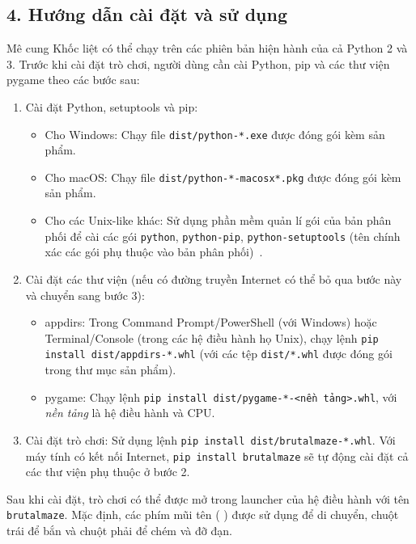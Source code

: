 \documentclass[a4paper,11pt]{article}
\begin{document}
\subsection*{4. Hướng dẫn cài đặt và sử dụng}
Mê cung Khốc liệt có thể chạy trên các phiên bản hiện hành của cả Python 2 và
3. Trước khi cài đặt trò chơi, người dùng cần cài Python, pip và các thư viện
pygame theo các bước sau:
\begin{enumerate}
  \item Cài đặt Python, setuptools và pip:
    \begin{itemize}
      \item Cho Windows: Chạy file \verb|dist/python-*.exe| được đóng gói kèm
        sản phẩm.
      \item Cho macOS: Chạy file \verb|dist/python-*-macosx*.pkg| được đóng gói
        kèm sản phẩm.
      \item Cho các Unix-like khác: Sử dụng phần mềm quản lí gói của bản phân
        phối để cài các gói \verb|python|, \verb|python-pip|,
        \verb|python-setuptools| (tên chính xác các gói phụ thuộc vào bản phân
        phối)~\cite{nixpip}.
    \end{itemize}
  \item Cài đặt các thư viện (nếu có đường truyền Internet có thể bỏ qua bước
    này và chuyển sang bước 3):
    \begin{itemize}
      \item appdirs: Trong Command Prompt/PowerShell (với Windows) hoặc
        Terminal/Console (trong các hệ điều hành họ Unix), chạy lệnh
        \verb|pip install dist/appdirs-*.whl| (với các tệp \verb|dist/*.whl|
        được đóng gói trong thư mục sản phẩm).
      \item pygame: Chạy lệnh \verb|pip install dist/pygame-*-<nền tảng>.whl|,
        với \emph{nền tảng} là hệ điều hành và CPU.
    \end{itemize}
  \item Cài đặt trò chơi: Sử dụng lệnh \verb|pip install dist/brutalmaze-*.whl|.
    Với máy tính có kết nối Internet, \verb|pip install brutalmaze| sẽ tự động
    cài đặt cả các thư viện phụ thuộc ở bước 2.
\end{enumerate}

Sau khi cài đặt, trò chơi có thể được mở trong launcher của hệ điều hành với
tên \verb|brutalmaze|. Mặc định, các phím mũi tên (\textuparrow \textleftarrow
\textdownarrow \textrightarrow) được sử dụng để di chuyển, chuột trái để bắn và
chuột phải để chém và đỡ đạn.
\end{document}
